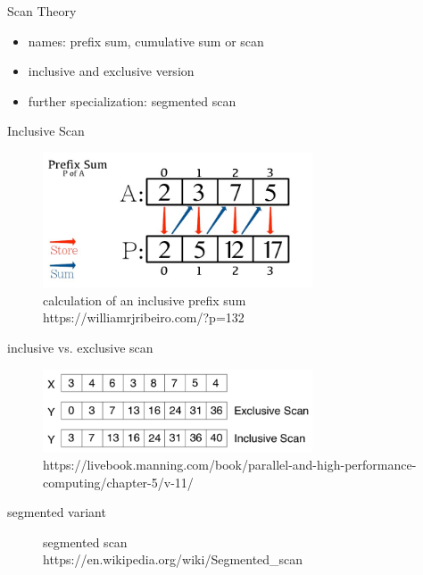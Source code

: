 \begin{frame}{Scan Theory}
	\begin{itemize}
		\item names: prefix sum, cumulative sum or scan
		\item inclusive and exclusive version
		\item further specialization: segmented scan
	\end{itemize}
\end{frame} 
\begin{frame}{Inclusive Scan}
	\begin{figure}
		\includegraphics[width=80mm]{wiki/prefix-sum.jpg}
		\caption{{calculation of an inclusive prefix sum\\ \tiny https://williamrjribeiro.com/?p=132}}
	\end{figure}
\end{frame}
\begin{frame}{inclusive vs. exclusive scan}
	\begin{figure}
		\includegraphics[width=80mm]{wiki/scans.png}
		\caption{{\tiny https://livebook.manning.com/book/parallel-and-high-performance-computing/chapter-5/v-11/}}
	\end{figure}
\end{frame}
\begin{frame}{segmented variant}
	\begin{figure}
		\caption{{segmented scan \\ \tiny https://en.wikipedia.org/wiki/Segmented\_scan}}
	\end{figure}
\end{frame}

